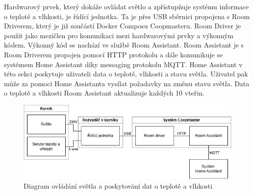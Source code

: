 Hardwarový prvek, který dokáže ovládat světlo a zpřístupňuje systému informace o teplotě a vlhkosti, je řídící jednotka.
Ta je přes USB sběrnici propojena s Room Driverem, který je již součástí Docker Composu Coopmasteru.
Room Driver je použit jako mezičlen pro komunikaci mezi hardwarovými prvky a výkonným kódem.
Výkonný kód se nachází ve službě Room Assistant.
Room Assistant je s Room Driverem propojen pomocí HTTP protokolu a dále komunikuje se systémem Home Assistant díky messaging protokolu MQTT.
Home Assistant v této sekci poskytuje uživateli data o teplotě, vlhkosti a stavu světla.
Uživatel pak může za pomoci Home Assistanta vysílat požadavky na změnu stavu světla.
Data o teplotě a vlhkosti Room Assistant aktualizuje každých 10 vteřin.
\begin{figure}[h]
    \centering
    \includegraphics[width=\textwidth]{img/svetlo_teplo_vlhkost}
    \caption{Diagram ovládání světla a poskytování dat o teplotě a vlhkosti}
    \label{fig:svetlo_teplo_vlhkost}
\end{figure}

